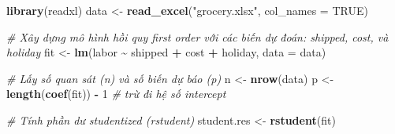 \documentclass[
]{article}
\newenvironment{Shaded}{\begin{snugshade}}{\end{snugshade}}
\newcommand{\AttributeTok}[1]{\textcolor[rgb]{0.13,0.29,0.53}{#1}}
\newcommand{\CommentTok}[1]{\textcolor[rgb]{0.56,0.35,0.01}{\textit{#1}}}
\newcommand{\ConstantTok}[1]{\textcolor[rgb]{0.56,0.35,0.01}{#1}}
\newcommand{\DecValTok}[1]{\textcolor[rgb]{0.00,0.00,0.81}{#1}}
\newcommand{\FunctionTok}[1]{\textcolor[rgb]{0.13,0.29,0.53}{\textbf{#1}}}
\newcommand{\NormalTok}[1]{#1}
\newcommand{\OtherTok}[1]{\textcolor[rgb]{0.56,0.35,0.01}{#1}}
\newcommand{\SpecialCharTok}[1]{\textcolor[rgb]{0.81,0.36,0.00}{\textbf{#1}}}
\newcommand{\StringTok}[1]{\textcolor[rgb]{0.31,0.60,0.02}{#1}}
\begin{document}
\begin{Shaded}
\begin{Highlighting}[]
\FunctionTok{library}\NormalTok{(readxl)}
\NormalTok{data }\OtherTok{\textless{}{-}} \FunctionTok{read\_excel}\NormalTok{(}\StringTok{"grocery.xlsx"}\NormalTok{, }\AttributeTok{col\_names =} \ConstantTok{TRUE}\NormalTok{)}

\CommentTok{\# Xây dựng mô hình hồi quy first order với các biến dự đoán: shipped, cost, và holiday}
\NormalTok{fit }\OtherTok{\textless{}{-}} \FunctionTok{lm}\NormalTok{(labor }\SpecialCharTok{\textasciitilde{}}\NormalTok{ shipped }\SpecialCharTok{+}\NormalTok{ cost }\SpecialCharTok{+}\NormalTok{ holiday, }\AttributeTok{data =}\NormalTok{ data)}

\CommentTok{\# Lấy số quan sát (n) và số biến dự báo (p)}
\NormalTok{n }\OtherTok{\textless{}{-}} \FunctionTok{nrow}\NormalTok{(data)}
\NormalTok{p }\OtherTok{\textless{}{-}} \FunctionTok{length}\NormalTok{(}\FunctionTok{coef}\NormalTok{(fit)) }\SpecialCharTok{{-}} \DecValTok{1}  \CommentTok{\# trừ đi hệ số intercept}

\CommentTok{\# Tính phần dư studentized (rstudent)}
\NormalTok{student.res }\OtherTok{\textless{}{-}} \FunctionTok{rstudent}\NormalTok{(fit)}


\end{Highlighting}
\end{Shaded}
\end{document}
